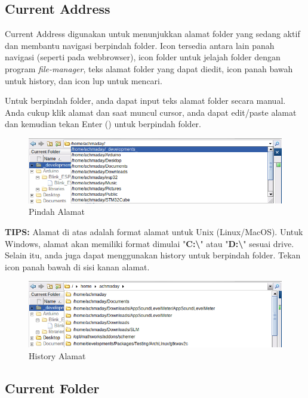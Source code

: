 \documentclass[12pt]{book}
\begin{document}
	\subsection{Current Address}
	
	Current Address digunakan untuk menunjukkan alamat folder yang sedang aktif dan membantu navigasi berpindah folder.
	Icon tersedia antara lain panah navigasi (seperti pada webbrowser), icon folder untuk jelajah folder dengan program \textit{file-manager},
	teks alamat folder yang dapat diedit, icon panah bawah untuk history, dan icon lup untuk mencari.
	
	Untuk berpindah folder, anda dapat input teks alamat folder secara manual.
	Anda cukup klik alamat dan saat muncul cursor, anda dapat edit/paste alamat dan kemudian tekan Enter (\keys{\return}) untuk berpindah folder.
	
	\begin{figure}[!ht]
		\centering
		\includegraphics[width=350pt]{images/addressbaredit}
		\caption{Pindah Alamat}
	\end{figure}

	\textbf{TIPS:} Alamat di atas adalah format alamat untuk Unix (Linux/MacOS).
	Untuk Windows, alamat akan memiliki format dimulai "\textbf{C:\textbackslash}" atau "\textbf{D:\textbackslash}" sesuai drive.\\
	
	Selain itu, anda juga dapat menggunakan history untuk berpindah folder.
	Tekan icon panah bawah di sisi kanan alamat.
	
	\begin{figure}[!ht]
		\centering
		\includegraphics[width=350pt]{images/addressbarhistory}
		\caption{History Alamat}
	\end{figure}
	
	\newpage
	\subsection{Current Folder}
	
\end{document}
